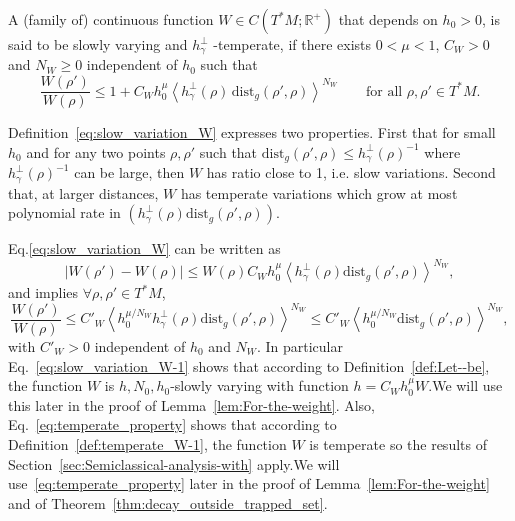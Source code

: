 \documentclass[AHL,Unicode,longabstracts,published]{cedram}
\newcommand{\dist}{\mathrm{dist}}
\newcommand{\bbR}{\mathbb{R}}
\let\oldforall\forall
\renewcommand*{\forall}{\mathrel{\oldforall}}
\newcommand{\bbR}{\mathbb{R}}
\begin{document}
\begin{cBoxA}{}
\begin{defi}\label{def:temperate_W}
A (family of) continuous function $W\in C(T^{*}M;\bbR^{+})$ that depends on $h_{0}>0$, is said to be slowly varying and $h_{\gamma}^{\perp}$ -temperate, if there exists $0<\mu<1$, $C_{W}>0$ and $N_{W}\geq0$ independent of $h_{0}$ such that
\begin{equation}\label{eq:slow_variation_W}
\frac{W\left(\rho'\right)}{W\left(\rho\right)}\leq1+C_{W}h_{0}^{\mu}\left\langle h_{\gamma}^{\perp}\left(\rho\right)\,\dist_{g}\left(\rho',\rho\right)\right\rangle ^{N_{W}}\qquad\text{for all }\rho,\rho'\in T^{*}M.
\end{equation}
\end{defi}
\end{cBoxA}

\begin{rema}
Definition~\eqref{eq:slow_variation_W} expresses two properties. First that for small $h_{0}$ and for any two points $\rho,\rho'$ such that $\dist_{g}(\rho',\rho)\leq h_{\gamma}^{\perp}(\rho)^{-1}$ where $h_{\gamma}^{\perp}(\rho)^{-1}$ can be large, then $W$ has ratio close to 1, i.e. slow variations. Second that, at larger distances, $W$ has temperate variations which grow at most polynomial rate in $(h_{\gamma}^{\perp}(\rho)\dist_{g}(\rho',\rho))$.
\end{rema}


\begin{rema}
Eq.\eqref{eq:slow_variation_W} can be written as
\begin{equation}\label{eq:slow_variation_W-1}
\left|W\left(\rho'\right)-W\left(\rho\right)\right|\leq W\left(\rho\right)C_{W}h_{0}^{\mu}\left\langle h_{\gamma}^{\perp}\left(\rho\right)\dist_{g}\left(\rho',\rho\right)\right\rangle ^{N_{W}},
\end{equation}
and implies $\forall\rho,\rho'\in T^{*}M$,
\begin{equation}\label{eq:temperate_property}
\frac{W\left(\rho'\right)}{W\left(\rho\right)}\leq C'_{W}\left\langle h_{0}^{\mu/N_{W}}h_{\gamma}^{\perp}\left(\rho\right)\dist_{g}\left(\rho',\rho\right)\right\rangle ^{N_{W}}\leq C'_{W}\left\langle h_{0}^{\mu/N_{W}}\dist_{g}\left(\rho',\rho\right)\right\rangle ^{N_{W}},
\end{equation}
with $C'_{W}>0$ independent of $h_{0}$ and $N_{W}$. In particular Eq.~\eqref{eq:slow_variation_W-1} shows that according to Definition~\ref{def:Let--be}, the function $W$ is $h,N_0,h_0$-slowly varying with function $h=C_{W}h_{0}^{\mu}W$.\linebreak We will use this later in the proof of Lemma~\ref{lem:For-the-weight}. Also, Eq.~\eqref{eq:temperate_property} shows that according to Definition~\ref{def:temperate_W-1}, the function $W$ is temperate so the results of Section~\ref{sec:Semiclassical-analysis-with} apply.\linebreak We will use~\eqref{eq:temperate_property} later in the proof of Lemma~\ref{lem:For-the-weight} and of Theorem~\ref{thm:decay_outside_trapped_set}.
\end{rema}
\end{document}
